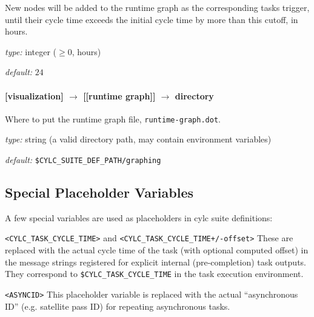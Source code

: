New nodes will be added to the runtime graph as the corresponding tasks
trigger, until their cycle time exceeds the initial cycle time by more
than this cutoff, in hours.

\begin{myitemize}
    \item {\em type:} integer ($\geq 0$, hours)
    \item {\em default:} $24$
\end{myitemize}

\paragraph[directory]{[visualization] $\rightarrow$ [[runtime graph]] $\rightarrow$ directory}

Where to put the runtime graph file, \lstinline=runtime-graph.dot=.

\begin{myitemize}
    \item {\em type:} string (a valid directory path, may contain environment variables)
    \item {\em default:} \lstinline=$CYLC_SUITE_DEF_PATH/graphing=
\end{myitemize}


\subsection{Special Placeholder Variables}

A few special variables are used as placeholders in cylc suite definitions:

\begin{myitemize}
    \item \lstinline=<CYLC_TASK_CYCLE_TIME>= and
        \lstinline=<CYLC_TASK_CYCLE_TIME+/-offset>= \newline
        These are replaced with the actual cycle time of the task (with
        optional computed offset) in the message strings registered for
        explicit internal (pre-completion) task outputs. They correspond to 
        \lstinline=$CYLC_TASK_CYCLE_TIME= in the task execution environment.

    \item \lstinline=<ASYNCID>=\newline
        This placeholder variable is replaced with the actual ``asynchronous
        ID'' (e.g. satellite pass ID) for repeating asynchronous tasks.
\end{myitemize}

